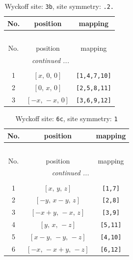 \documentclass[fleqn,8pt]{jsarticle}
\begin{document}
\begin{longtable}{ccc}
\caption{Wyckoff site: {\tt 3b}, site symmetry: {\tt .2.}}
 \\
 \hline \hline
No. & position & mapping \\ \hline \endfirsthead

\multicolumn{2}{l}{\tablename\ \thetable{}} \\
 \hline \hline
No. & position & mapping \\ \hline \endhead

 \hline \hline
\multicolumn{2}{r}{\footnotesize\it continued ...} \\ \endfoot

 \hline \hline
\multicolumn{2}{r}{} \\ \endlastfoot

1 & $\left[ x,\, 0,\, 0 \right]$ & {\tt [1,4,7,10]} \\ \hline
2 & $\left[ 0,\, x,\, 0 \right]$ & {\tt [2,5,8,11]} \\ \hline
3 & $\left[ - x,\, - x,\, 0 \right]$ & {\tt [3,6,9,12]} \\
\end{longtable}
\renewcommand{\arraystretch}{1.2}
\begin{longtable}{ccc}
\caption{Wyckoff site: {\tt 6c}, site symmetry: {\tt 1}}
 \\
 \hline \hline
No. & position & mapping \\ \hline \endfirsthead

\multicolumn{2}{l}{\tablename\ \thetable{}} \\
 \hline \hline
No. & position & mapping \\ \hline \endhead

 \hline \hline
\multicolumn{2}{r}{\footnotesize\it continued ...} \\ \endfoot

 \hline \hline
\multicolumn{2}{r}{} \\ \endlastfoot

1 & $\left[ x,\, y,\, z \right]$ & {\tt [1,7]} \\ \hline
2 & $\left[ - y,\, x - y,\, z \right]$ & {\tt [2,8]} \\ \hline
3 & $\left[ - x + y,\, - x,\, z \right]$ & {\tt [3,9]} \\ \hline
4 & $\left[ y,\, x,\, - z \right]$ & {\tt [5,11]} \\ \hline
5 & $\left[ x - y,\, - y,\, - z \right]$ & {\tt [4,10]} \\ \hline
6 & $\left[ - x,\, - x + y,\, - z \right]$ & {\tt [6,12]} \\
\end{longtable}
\end{document}
